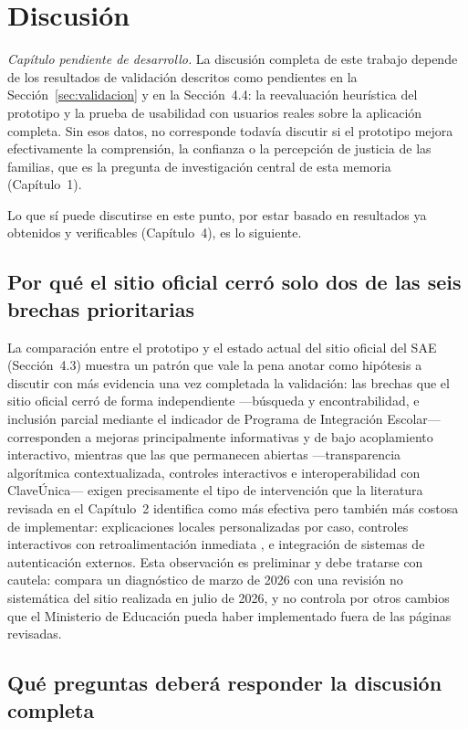\chapter{Discusión}

\emph{Capítulo pendiente de desarrollo.} La discusión completa de este trabajo depende de los resultados de validación descritos como pendientes en la Sección~\ref{sec:validacion} y en la Sección~4.4: la reevaluación heurística del prototipo y la prueba de usabilidad con usuarios reales sobre la aplicación completa. Sin esos datos, no corresponde todavía discutir si el prototipo mejora efectivamente la comprensión, la confianza o la percepción de justicia de las familias, que es la pregunta de investigación central de esta memoria (Capítulo~1).

Lo que sí puede discutirse en este punto, por estar basado en resultados ya obtenidos y verificables (Capítulo~4), es lo siguiente.

\section{Por qué el sitio oficial cerró solo dos de las seis brechas prioritarias}

La comparación entre el prototipo y el estado actual del sitio oficial del SAE (Sección~4.3) muestra un patrón que vale la pena anotar como hipótesis a discutir con más evidencia una vez completada la validación: las brechas que el sitio oficial cerró de forma independiente —búsqueda y encontrabilidad, e inclusión parcial mediante el indicador de Programa de Integración Escolar— corresponden a mejoras principalmente informativas y de bajo acoplamiento interactivo, mientras que las que permanecen abiertas —transparencia algorítmica contextualizada, controles interactivos e interoperabilidad con ClaveÚnica— exigen precisamente el tipo de intervención que la literatura revisada en el Capítulo~2 identifica como más efectiva pero también más costosa de implementar: explicaciones locales personalizadas por caso, controles interactivos con retroalimentación inmediata \citep{kim2021recommender,feddersen2024forecasting}, e integración de sistemas de autenticación externos. Esta observación es preliminar y debe tratarse con cautela: compara un diagnóstico de marzo de 2026 con una revisión no sistemática del sitio realizada en julio de 2026, y no controla por otros cambios que el Ministerio de Educación pueda haber implementado fuera de las páginas revisadas.

\section{Qué preguntas deberá responder la discusión completa}


